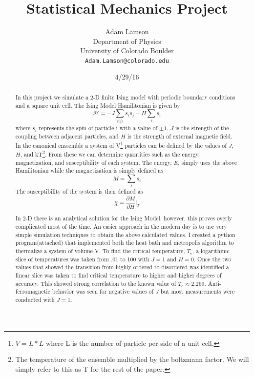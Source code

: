 \documentclass[a4paper,11pt]{article}
\title{Statistical Mechanics Project}
\author{Adam Lamson\\
Department of Physics\\
University of Colorado Boulder\\
\texttt{Adam.Lamson@colorado.edu}}
\date{4/29/16}
\begin{document}
\maketitle

\begin{center}
\end{center}

\tableofcontents

\begin{abstract}
    In this project we simulate a 2-D finite Ising model with periodic boundary conditions and a square unit cell. The Ising Model Hamilitonian is given by
    \begin{equation}
        \mathcal{H} = -J \sum_{\langle ij \rangle} s_i s_j - H\sum_i s_i
    \end{equation}
    where $s_i$ represents the spin of particle i with a value of $\pm1$, $J$ is the strength of the coupling between adjacent particles, and $H$ is the strength of external magnetic field. In the canonical enssemble a system of V\footnote{$V=L*L$ where L is the number of particle per side of a unit cell.} particles can be defined by the values of $J$, $H$, and kT\footnote{The temperature of the ensemble multiplied by the boltzmann factor. We will simply refer to this as T for the rest of the paper.}. From these we can determine quantities such as the energy, magnetization, and susceptibility of each system. The energy, $E$, simply uses the above Hamilitonian while the magnetization is simply defined as 
    \begin{equation}
        M = \sum_i s_i
    \end{equation}
The susceptibility of the system is then defined as 
    \begin{equation}
        \chi = \frac{\partial M}{\partial H}\bigg\vert_T 
    \end{equation}

    In 2-D there is an analytical solution for the Ising Model, however, this proves overly complicated most of the time. An easier approach in the modern day is to use very simple simulation techniques to obtain the above calculated values. I created a python program(attached) that implemented both the heat bath and metropolis algorithm to thermalize a system of volume V. To find the critical temperature, $T_c$, a logarithmic slice of temperatures was taken from .01 to 100 with $J=1$ and $H=0$. Once the two values that showed the transition from highly ordered to disordered was identified a linear slice was taken to find critical temperature to higher and higher degrees of accuracy. This showed strong correlation to the known value of $T_c \approx 2.269$. Anti-ferromagnetic behavior was seen for negative values of $J$ but most measurements were conducted with $J=1$.

\end{abstract}
\end{document}

